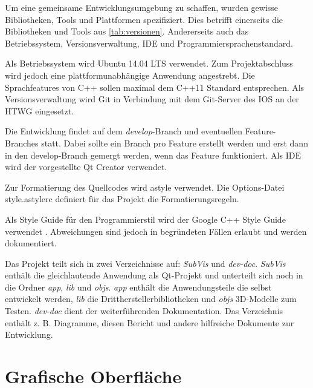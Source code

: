 Um eine gemeinsame Entwicklungsumgebung zu schaffen, wurden gewisse Bibliotheken, Tools und Plattformen spezifiziert.
Dies betrifft einerseits die Bibliotheken und Tools aus \autoref{tab:versionen}.
Andererseits auch das Betriebssystem, Versionsverwaltung, IDE und Programmiersprachenstandard.

Als Betriebssystem wird Ubuntu 14.04 LTS verwendet. 
Zum Projektabschluss wird jedoch eine plattformunabhängige Anwendung angestrebt.
Die Sprachfeatures von C++ sollen maximal dem C++11 Standard entsprechen.
Als Versionsverwaltung wird Git in Verbindung mit dem Git-Server des IOS an der HTWG eingesetzt. 

Die Entwicklung findet auf dem \emph{develop}-Branch und eventuellen Feature-Branches statt.
Dabei sollte ein Branch pro Feature erstellt werden und erst dann in den develop-Branch gemergt werden, wenn das Feature funktioniert.
Als IDE wird der vorgestellte Qt Creator verwendet.

Zur Formatierung des Quellcodes wird astyle verwendet. 
Die Options-Datei style.astylerc definiert für das Projekt die Formatierungsregeln. 

Als Style Guide für den Programmierstil wird der Google C++ Style Guide verwendet \cite{GsgC++}.
Abweichungen sind jedoch in begründeten Fällen erlaubt und werden dokumentiert.

Das Projekt teilt sich in zwei Verzeichnisse auf: \emph{SubVis} und \emph{dev-doc}.
\emph{SubVis} enthält die gleichlautende Anwendung als Qt-Projekt und unterteilt sich noch in die Ordner \emph{app}, \emph{lib} und \emph{objs}.
\emph{app} enthält die Anwendungsteile die selbst entwickelt werden,
\emph{lib} die Drittherstellerbibliotheken und \emph{objs} 3D-Modelle zum Testen.
\emph{dev-doc} dient der weiterführenden Dokumentation.
Das Verzeichnis enthält z. B. Diagramme, diesen Bericht und andere hilfreiche Dokumente zur Entwicklung.

\section{Grafische Oberfläche} \label{sec:gui}

